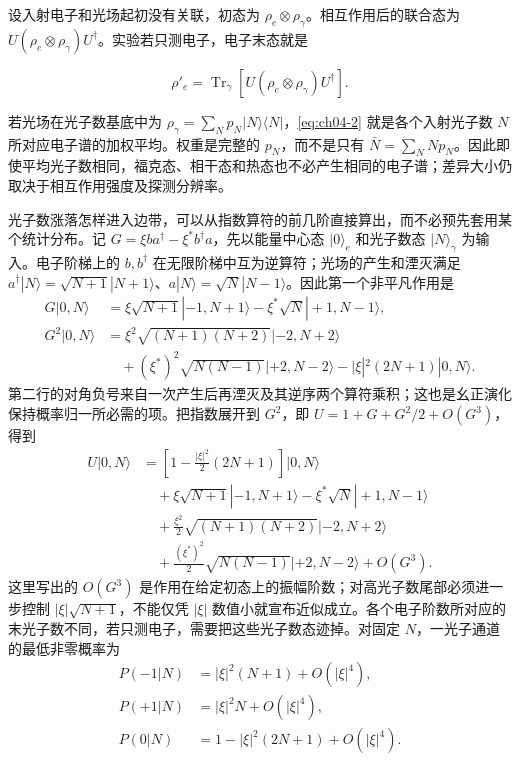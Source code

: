 设入射电子和光场起初没有关联，初态为 $\rho_e\otimes\rho_\gamma$。相互作用后的联合态为 $U(\rho_e\otimes\rho_\gamma)U^\dagger$。实验若只测电子，电子末态就是

\begin{equation}
\rho'_e=\operatorname{Tr}_\gamma\!\left[U(\rho_e\otimes\rho_\gamma)U^\dagger\right].
\label{eq:ch04-2}
\end{equation}

若光场在光子数基底中为 $\rho_\gamma=\sum_N p_N|N\rangle\langle N|$，\cref{eq:ch04-2} 就是各个入射光子数 $N$ 所对应电子谱的加权平均。权重是完整的 $p_N$，而不是只有 $\bar N=\sum_NNp_N$。因此即使平均光子数相同，福克态、相干态和热态也不必产生相同的电子谱；差异大小仍取决于相互作用强度及探测分辨率。


光子数涨落怎样进入边带，可以从指数算符的前几阶直接算出，而不必预先套用某个统计分布。记
$G=\xi ba^\dagger-\xi^*b^\dagger a$，先以能量中心态 $|0\rangle_e$ 和光子数态 $|N\rangle_\gamma$ 为输入。电子阶梯上的 $b,b^\dagger$ 在无限阶梯中互为逆算符；光场的产生和湮灭满足
$a^\dagger|N\rangle=\sqrt{N+1}|N+1\rangle$、$a|N\rangle=\sqrt N|N-1\rangle$。因此第一个非平凡作用是
\begin{align*}
G|0,N\rangle
 &=\xi\sqrt{N+1}|-1,N+1\rangle
  -\xi^*\sqrt N|+1,N-1\rangle,\\
G^2|0,N\rangle
 &=\xi^2\sqrt{(N+1)(N+2)}|-2,N+2\rangle\\
 &\quad+ (\xi^*)^2\sqrt{N(N-1)}|+2,N-2\rangle
  -|\xi|^2(2N+1)|0,N\rangle.
\end{align*}
第二行的对角负号来自一次产生后再湮灭及其逆序两个算符乘积；这也是幺正演化保持概率归一所必需的项。把指数展开到 $G^2$，即
$U=1+G+G^2/2+O(G^3)$，得到
\begin{align*}
U|0,N\rangle
&=\left[1-\frac{|\xi|^2}{2}(2N+1)\right]|0,N\rangle\\
&\quad+\xi\sqrt{N+1}|-1,N+1\rangle
-\xi^*\sqrt N|+1,N-1\rangle\\
&\quad+\frac{\xi^2}{2}\sqrt{(N+1)(N+2)}|-2,N+2\rangle\\
&\quad+\frac{(\xi^*)^2}{2}\sqrt{N(N-1)}|+2,N-2\rangle+O(G^3).
\end{align*}
这里写出的 $O(G^3)$ 是作用在给定初态上的振幅阶数；对高光子数尾部必须进一步控制 $|\xi|\sqrt{N+1}$，不能仅凭 $|\xi|$ 数值小就宣布近似成立。各个电子阶数所对应的末光子数不同，若只测电子，需要把这些光子数态迹掉。对固定 $N$，一光子通道的最低非零概率为
\begin{align*}
P(-1|N)&=|\xi|^2(N+1)+O(|\xi|^4),\\
P(+1|N)&=|\xi|^2N+O(|\xi|^4),\\
P(0|N)&=1-|\xi|^2(2N+1)+O(|\xi|^4).
\end{align*}
